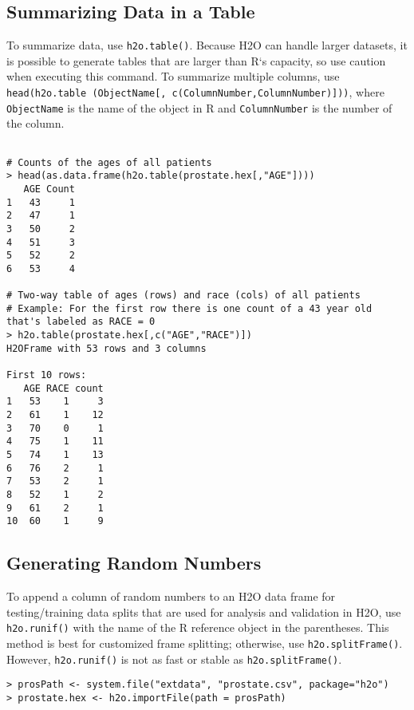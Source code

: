 {{\subsection{Summarizing Data in a Table}


To summarize data, use {\texttt{h2o.table()}}. Because H2O can handle larger datasets, it is possible to generate tables that are larger than R`s capacity, so use caution when executing this command.
To summarize multiple columns, use {\texttt{head(h2o.table (ObjectName[, c(ColumnNumber,ColumnNumber)]))}}, where {\texttt{ObjectName}} is the name of the object in R and {\texttt{ColumnNumber}} is the number of the column.

\waterExampleInR
\medskip
\begin{lstlisting}[style=R]

# Counts of the ages of all patients
> head(as.data.frame(h2o.table(prostate.hex[,"AGE"])))
   AGE Count
1   43     1
2   47     1
3   50     2
4   51     3
5   52     2
6   53     4

# Two-way table of ages (rows) and race (cols) of all patients
# Example: For the first row there is one count of a 43 year old that's labeled as RACE = 0
> h2o.table(prostate.hex[,c("AGE","RACE")])
H2OFrame with 53 rows and 3 columns

First 10 rows:
   AGE RACE count
1   53    1     3
2   61    1    12
3   70    0     1
4   75    1    11
5   74    1    13
6   76    2     1
7   53    2     1
8   52    1     2
9   61    2     1
10  60    1     9
\end{lstlisting}

\subsection{Generating Random Numbers}

To append a column of random numbers to an H2O data frame for testing/training data splits that are used for analysis and validation in H2O, use {\texttt{h2o.runif()}} with the name of the R reference object in the parentheses. This method is best for customized frame splitting; otherwise, use {\texttt{h2o.splitFrame()}}. However, {\texttt{h2o.runif()}} is not as fast or stable as {\texttt{h2o.splitFrame()}}.

\waterExampleInR
\medskip
\begin{lstlisting}[style=R]
> prosPath <- system.file("extdata", "prostate.csv", package="h2o")
> prostate.hex <- h2o.importFile(path = prosPath)


\end{lstlisting}}}
